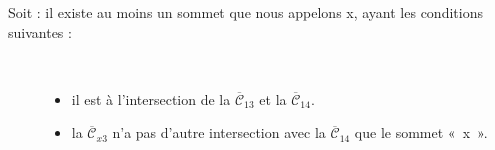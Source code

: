 \begin{adjustwidth}{3.5em}{0pt}
\begin{description}
	\item[Soit : il existe au moins un sommet que nous appelons x, ayant les conditions suivantes :]\
	\begin{itemize}[label=--]
		\item il est à l'intersection de la $\overline{\mathcal{C}}_{13}$ et la $\overline{\mathcal{C}}_{14}$.
		\item la $\overline{\mathcal{C}}_{x3}$ n'a pas d'autre intersection avec la  $\overline{\mathcal{C}}_{14}$ que le sommet «~x~».\\
	\end{itemize}


\end{description}
\end{adjustwidth}
